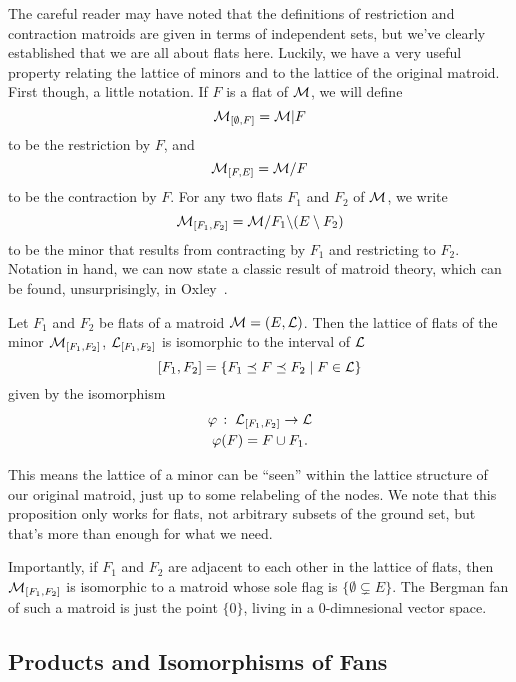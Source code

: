 \documentclass[12pt,oneside]{../../sfsuthesis}
\begin{document}
The careful reader may have noted that the definitions of restriction and contraction matroids are given in terms of independent sets, but we've clearly established that we are all about flats here.
Luckily, we have a very useful property relating the lattice of minors and to the lattice of the original matroid.
First though, a little notation.
If \( F \) is a flat of \( \mathcal{M} \), we will define
\[
    \mathcal{M}_{[\emptyset, F]} = \mathcal{M}|F
\]
to be the restriction by \( F \), and
\[
    \mathcal{M}_{[F, E]} = \mathcal{M}  / F
\]
to be the contraction by \( F \).
For any two flats \( F_1 \) and \( F_2 \) of \( \mathcal{M} \), we write
\[
    \mathcal{M}_{[F_1, F_2]} = \mathcal{M} / F_1 \backslash (E \setminus F_2)
\]
to be the minor that results from contracting by \( F_1 \) and restricting to \( F_2 \).
Notation in hand, we can now state a classic result of matroid theory, which can be found, unsurprisingly, in Oxley~\cite[p.~116]{oxleyMatroidTheory2011}.

\begin{proposition}\th\label{thm:minorLattice}
    Let \( F_1 \) and \( F_2 \) be flats of a matroid \( \mathcal{M} = (E, \mathcal{L})\).
    Then the lattice of flats of the minor \( \mathcal{M}_{[F_1, F_2]} \), \( \mathcal{L}_{[F_1, F_2]} \) is isomorphic to the interval of \( \mathcal{L} \)
    \[
        [F_1, F_2] = \{ F_1 \preceq F \preceq F_2 \; | \; F \in \mathcal{L} \}
    \]
    given by the isomorphism
    \begin{gather*}
        \varphi\,:\; \mathcal{L}_{[F_1, F_2]} \to \mathcal{L} \\
        \varphi(F) = F \cup F_1.
    \end{gather*}
\end{proposition}

This means the lattice of a minor can be ``seen'' within the lattice structure of our original matroid, just up to some relabeling of the nodes.
We note that this proposition only works for flats, not arbitrary subsets of the ground set, but that's more than enough for what we need.

Importantly, if \( F_1 \) and \( F_2 \) are adjacent to each other in the lattice of flats, then \( \mathcal{M}_{[F_1, F_2]} \) is isomorphic to a matroid whose sole flag is \( \{ \emptyset \subsetneq E \} \).
The Bergman fan of such a matroid is just the point \( \{ 0 \} \), living in a \( 0 \)-dimnesional vector space.

\subsection{Products and Isomorphisms of Fans}
\end{document}
